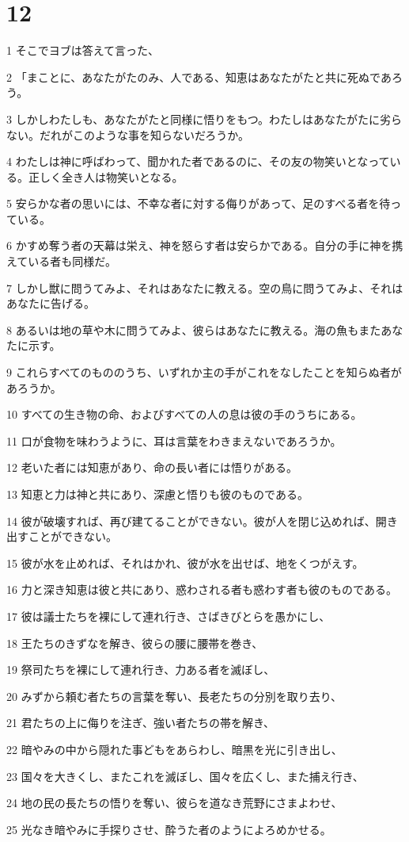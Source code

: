 \chapter{12}

\par 1 そこでヨブは答えて言った、
\par 2 「まことに、あなたがたのみ、人である、知恵はあなたがたと共に死ぬであろう。
\par 3 しかしわたしも、あなたがたと同様に悟りをもつ。わたしはあなたがたに劣らない。だれがこのような事を知らないだろうか。
\par 4 わたしは神に呼ばわって、聞かれた者であるのに、その友の物笑いとなっている。正しく全き人は物笑いとなる。
\par 5 安らかな者の思いには、不幸な者に対する侮りがあって、足のすべる者を待っている。
\par 6 かすめ奪う者の天幕は栄え、神を怒らす者は安らかである。自分の手に神を携えている者も同様だ。
\par 7 しかし獣に問うてみよ、それはあなたに教える。空の鳥に問うてみよ、それはあなたに告げる。
\par 8 あるいは地の草や木に問うてみよ、彼らはあなたに教える。海の魚もまたあなたに示す。
\par 9 これらすべてのもののうち、いずれか主の手がこれをなしたことを知らぬ者があろうか。
\par 10 すべての生き物の命、およびすべての人の息は彼の手のうちにある。
\par 11 口が食物を味わうように、耳は言葉をわきまえないであろうか。
\par 12 老いた者には知恵があり、命の長い者には悟りがある。
\par 13 知恵と力は神と共にあり、深慮と悟りも彼のものである。
\par 14 彼が破壊すれば、再び建てることができない。彼が人を閉じ込めれば、開き出すことができない。
\par 15 彼が水を止めれば、それはかれ、彼が水を出せば、地をくつがえす。
\par 16 力と深き知恵は彼と共にあり、惑わされる者も惑わす者も彼のものである。
\par 17 彼は議士たちを裸にして連れ行き、さばきびとらを愚かにし、
\par 18 王たちのきずなを解き、彼らの腰に腰帯を巻き、
\par 19 祭司たちを裸にして連れ行き、力ある者を滅ぼし、
\par 20 みずから頼む者たちの言葉を奪い、長老たちの分別を取り去り、
\par 21 君たちの上に侮りを注ぎ、強い者たちの帯を解き、
\par 22 暗やみの中から隠れた事どもをあらわし、暗黒を光に引き出し、
\par 23 国々を大きくし、またこれを滅ぼし、国々を広くし、また捕え行き、
\par 24 地の民の長たちの悟りを奪い、彼らを道なき荒野にさまよわせ、
\par 25 光なき暗やみに手探りさせ、酔うた者のようによろめかせる。


